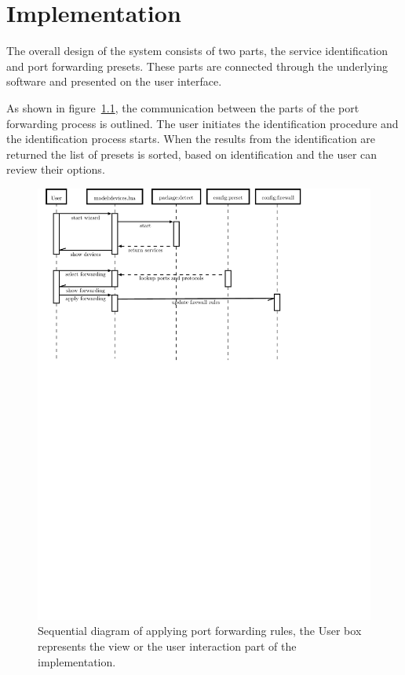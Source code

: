 \documentclass[a4paper,11pt,makeidx]{kth-bcs}
\begin{document}
\chapter{Implementation}
The overall design of the system consists of two parts, the service identification and port forwarding presets.
These parts are connected through the underlying software and presented on the user interface.

As shown in figure~\ref{fig:wizard-seq_dia}, the communication between the parts of the port forwarding process is outlined.
The user initiates the identification procedure and the identification process starts.
When the results from the identification are returned the list of presets is sorted, based on identification and the user can review their options.

\begin{figure}[h!]
   \centering
   \includegraphics[trim = 0mm 195mm 30mm 0mm, clip, width=15cm,natwidth=1.0in,natheight=1.0in]{wizard-seq_dia}
   \caption{Sequential diagram of applying port forwarding rules, the User box represents the view or the user interaction part of the implementation.}
   \label{fig:wizard-seq_dia}
\end{figure}
\end{document}
